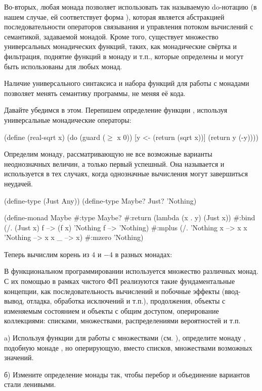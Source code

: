 Во-вторых, любая монада позволяет использовать так называемую do-нотацию (в нашем случае, ей соответствует форма ), которая является абстракцией последовательности операторов связывания и управления потоком вычислений с семантикой, задаваемой монадой. Кроме того, существует множество универсальных монадических функций, таких, как монадические свёртка и фильтрация, поднятие функций в монаду и т.п., которые определены и могут быть использованы для любых монад.

Наличие универсального синтаксиса и набора функций для работы с монадами позволяет менять семантику программы, не меняя её кода.

Давайте убедимся в этом. Перепишем определение функции , используя универсальные монадические операторы:
\begin{SchemeCode}
(define (real-sqrt x)
  (do (guard ($\ge$ x 0))
      [y <- (return (sqrt x))]
      (return y (-y))))
\end{SchemeCode}

Определим монаду, рассматривающую не все возможные варианты неоднозначных величин, а только первый успешный. Она называется  и используется в тех случаях, когда однозначные вычисления могут завершиться неудачей.
\begin{SchemeCode}
(define-type (Just Any))
(define-type Maybe? Just? 'Nothing)

(define-monad Maybe
  #:type Maybe?
  #:return (lambda (x . y) (Just x))
  #:bind   (/. (Just x) f --> (f x)
               'Nothing f --> 'Nothing)
  #:mplus  (/. 'Nothing x --> x
               x 'Nothing --> x
               x _ --> x)
  #:mzero  'Nothing)
\end{SchemeCode}

\noindent
Теперь вычислим корень из $4$ и $-4$ в разных монадах:

В функциональном программировании используется множество различных монад. С их помощью в рамках чистого ФП реализуются такие фундаментальные концепции, как последовательность вычислений и побочные эффекты (ввод-вывод, отладка, обработка исключений и т.п.), продолжения, объекты с изменяемым состоянием и объекты с общим доступом, оперирование коллекциями: списками, множествами, распределениями вероятностей и т.п.

\newpage
\begin{Assignment}
a) Используя функции для работы с множествами (см. ), определите монаду , подобную монаде , но оперирующую, вместо списков, множествами возможных значений. 

б) Измените определение монады  так, чтобы перебор и объединение вариантов стали ленивыми.
\end{Assignment}

